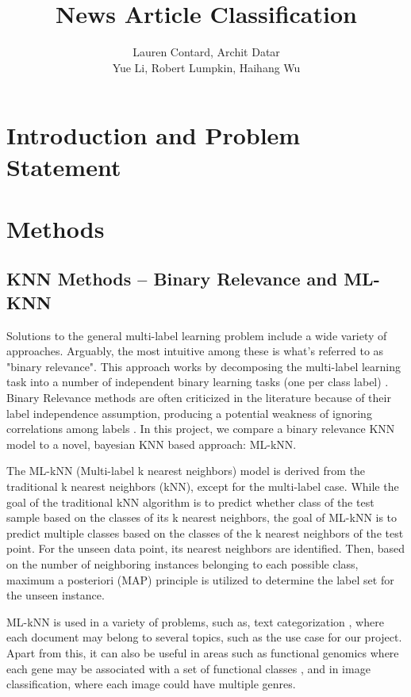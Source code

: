 \documentclass[11pt]{article}
\title{\Huge News Article Classification}
\author{Lauren Contard, Archit Datar \\ 
Yue Li, Robert Lumpkin, Haihang Wu}
\date{}
\begin{document}
\begin{singlespace}
    \maketitle
\end{singlespace}


\section{Introduction and Problem Statement}

\section{Methods}

\subsection{KNN Methods -- Binary Relevance and ML-KNN}

Solutions to the general multi-label learning problem include a wide variety of approaches. Arguably, the most intuitive among these is what's referred to as "binary relevance". This approach works by decomposing the multi-label learning task into a number of independent binary learning tasks (one per class label) \autocite{brOverview}. Binary Relevance methods are often criticized in the literature because of their label independence assumption, producing a potential weakness of ignoring correlations among labels \autocite{brEfficacy}. In this project, we compare a binary relevance KNN model to a novel, bayesian KNN based approach: ML-kNN.

The ML-kNN (Multi-label k nearest neighbors) model is derived from the traditional k nearest neighbors (kNN), except for the multi-label case. While the goal of the traditional kNN algorithm is to predict whether class of the test sample based on the classes of its k nearest neighbors, the goal of ML-kNN is to predict multiple classes based on the classes of the k nearest neighbors of the test point. For the unseen data point, its nearest neighbors are identified. Then, based on the number of neighboring instances belonging to each possible class, maximum a posteriori (MAP) principle is utilized to determine the label set for the unseen instance. 

ML-kNN is used in a variety of problems, such as, text categorization \autocite{McCallum99multi-labeltext}, where each document may belong to several topics, such as the use case for our project. Apart from this, it can also be useful in areas such as functional genomics where each gene may be associated with a set of functional classes \autocite{KernelMulti-labelClassification}, and in image classification, where each image could have multiple genres.\autocite{Boutell04learningmulti-label}  
\end{document}
